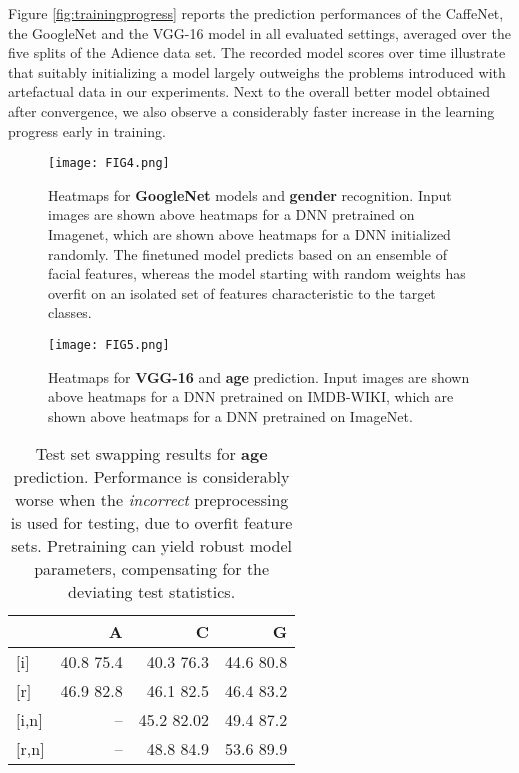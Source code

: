 \documentclass[10pt,twocolumn,letterpaper]{article}
\begin{document}
Figure \ref{fig:trainingprogress} reports the prediction performances of the CaffeNet, the GoogleNet and the VGG-16 model in all evaluated settings, averaged over the five splits of the Adience data set. The recorded model scores over time illustrate that suitably initializing a model largely outweighs the problems introduced with artefactual data in our experiments. Next to the overall better model obtained after convergence, we also observe a considerably faster increase in the learning progress early in training.



\begin{figure}
\begin{center}
\texttt{[image: FIG4.png]}
\end{center}
\caption{Heatmaps for \textbf{GoogleNet} models and \textbf{gender} recognition. Input images are shown above heatmaps for a DNN pretrained on Imagenet, which are shown above heatmaps for a DNN initialized randomly. The finetuned model predicts based on an ensemble of facial features, whereas the model starting with random weights has overfit on an isolated set of features characteristic to the target classes.}
\label{fig:googlenetinitgender}
\end{figure}


\begin{figure}
\begin{center}
\texttt{[image: FIG5.png]}
\end{center}
\caption{Heatmaps for \textbf{VGG-16} and \textbf{age} prediction. Input images are shown above heatmaps for a DNN pretrained on IMDB-WIKI, which are shown above heatmaps for a DNN pretrained on ImageNet.}
\label{fig:vgginitage}
\end{figure}





\begin{table}
\begin{center}
\begin{tabular}{l|rrr}
	& \textbf{A} & \textbf{C} & \textbf{G}\\
\hline
	 $[$i$]$ 		& 40.8 \tiny{75.4}	& 40.3 \tiny{76.3}	& 44.6 \tiny{80.8}	\\
	 $[$r$]$ 		& 46.9	\tiny{82.8} & 46.1	\tiny{82.5} & 46.4	\tiny{83.2}  \\
	 \hline
	 $[$i,n$]$ 	& --  	& 45.2 \tiny{82.02}	& 49.4 \tiny{87.2}	\\
	 $[$r,n$]$ 	& -- 	& 48.8 \tiny{84.9} 	& 53.6 \tiny{89.9}	\\
\hline
\end{tabular}
\end{center}
	\caption{
	Test set swapping results for \textbf{age} prediction.
	Performance is considerably worse when the \textit{incorrect} preprocessing is used for testing, due to overfit feature sets. Pretraining can yield robust model parameters, compensating for the deviating test statistics.
	}
	\label{tab:ageresultsopposite}
\end{table}
\end{document}
